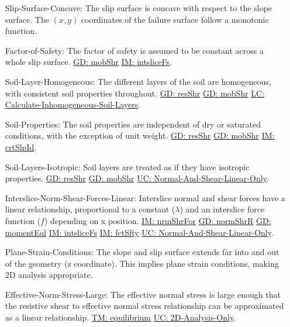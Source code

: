 \documentclass[12pt]{article}
\begin{document}
\begin{itemize}
\item[Slip-Surface-Concave:\phantomsection\label{assumpSSC}]The slip surface is concave with respect to the slope surface. The $(x,y)$ coordinates of the failure surface follow a monotonic function.
\item[Factor-of-Safety:\phantomsection\label{assumpFOS}]The factor of safety is assumed to be constant across a whole slip surface. \hyperref[GD:mobShr]{GD: mobShr} \hyperref[IM:intsliceFs]{IM: intsliceFs}.
\item[Soil-Layer-Homogeneous:\phantomsection\label{assumpSLH}]The different layers of the soil are homogeneous, with consistent soil properties throughout. \hyperref[GD:resShr]{GD: resShr} \hyperref[GD:mobShr]{GD: mobShr} \hyperref[LC_inhomogeneous]{LC: Calculate-Inhomogeneous-Soil-Layers}.
\item[Soil-Properties:\phantomsection\label{assumpSP}]The soil properties are independent of dry or saturated conditions, with the exception of unit weight. \hyperref[GD:resShr]{GD: resShr} \hyperref[GD:mobShr]{GD: mobShr} \hyperref[IM:crtSlpId]{IM: crtSlpId}.
\item[Soil-Layers-Isotropic:\phantomsection\label{assumpSLI}]Soil layers are treated as if they have isotropic properties. \hyperref[GD:resShr]{GD: resShr} \hyperref[GD:mobShr]{GD: mobShr} \hyperref[UC_normshearlinear]{UC: Normal-And-Shear-Linear-Only}.
\item[Interslice-Norm-Shear-Forces-Linear:\phantomsection\label{assumpINSFL}]Interslice normal and shear forces have a linear relationship, proportional to a constant ($λ$) and an interslice force function ($f$) depending on x position. \hyperref[IM:nrmShrFor]{IM: nrmShrFor} \hyperref[GD:normShrR]{GD: normShrR} \hyperref[GD:momentEql]{GD: momentEql} \hyperref[IM:intsliceFs]{IM: intsliceFs} \hyperref[IM:fctSfty]{IM: fctSfty} \hyperref[UC_normshearlinear]{UC: Normal-And-Shear-Linear-Only}.
\item[Plane-Strain-Conditions:\phantomsection\label{assumpPSC}]The slope and slip surface extends far into and out of the geometry (z coordinate). This implies plane strain conditions, making 2D analysis appropriate.
\item[Effective-Norm-Stress-Large:\phantomsection\label{assumpENSL}]The effective normal stress is large enough that the resistive shear to effective normal stress relationship can be approximated as a linear relationship. \hyperref[TM:equilibrium]{TM: equilibrium} \hyperref[UC_2donly]{UC: 2D-Analysis-Only}.

\end{itemize}
\end{document}
